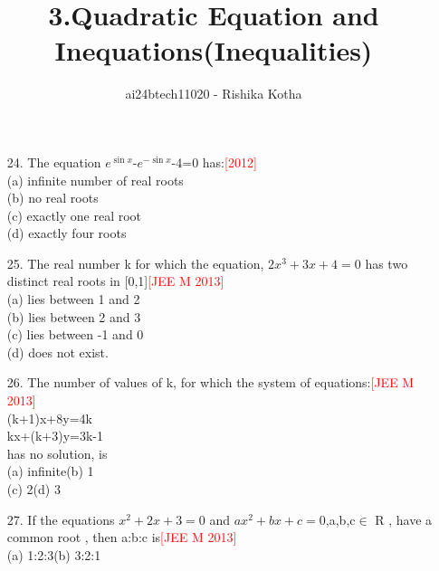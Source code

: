 \documentclass[journal,12pt,twocolumn]{IEEEtran}
\theoremstyle{remark}
\begin{document}

\vspace{3cm}

\title{3.Quadratic Equation and Inequations(Inequalities)}\textbf{}
\author{ai24btech11020 - Rishika Kotha}
\begin{enumerate}
\maketitle
\item[24.] The equation $e^{\sin x}$-$e^{-\sin x}$-4=0 has:\hspace{1cm}\textcolor{red}{[2012]}\\[6pt]
        (a)   infinite number of real roots\\[2pt]
        (b)   no real roots\\[2pt]
        (c)   exactly one real root\\[2pt]
        (d)   exactly four roots\\[6pt]
\item[25.] The real number k for which the equation, $2x^3+3x+4=0$ has two distinct real roots in [0,1]\hspace{4.6cm}\textcolor{red}{[JEE M 2013]}\\[6pt]
        (a)  lies between 1 and 2\\[2pt]
        (b)  lies between 2 and 3\\[2pt]
        (c)  lies between -1 and 0\\[2pt]
        (d)  does not exist.\\[6pt]
\item[26.] The number of values of k, for which the system of equations:\hspace{2cm}\textcolor{red}{[JEE M 2013]}\\[6pt]
     (k+1)x+8y=4k\\[2pt]
     kx+(k+3)y=3k-1\\[2pt]
has no solution, is\\[2pt]
(a)  infinite\hspace{2.4cm}(b)  1\\[2pt]
(c)  2\hspace{3.4cm}(d)  3\\[6pt]
\item[27.] If the equations $x^2+2x+3=0$ and $ax^2+bx+c=0$,a,b,c$\in$ R , have a   common   root , then a:b:c is\hspace{2.3cm}\textcolor{red}{[JEE M 2013]}\\[6pt]
(a)  1:2:3\hspace{2.7cm}(b)  3:2:1\\[2pt]

\end{enumerate}
\end{document}
